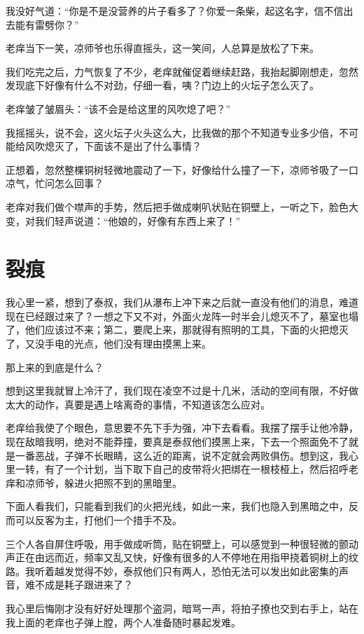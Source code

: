 我没好气道：“你是不是没营养的片子看多了？你爱一条柴，起这名字，信不信出去能有雷劈你？”

老痒当下一笑，凉师爷也乐得直摇头，这一笑间，人总算是放松了下来。

我们吃完之后，力气恢复了不少，老痒就催促着继续赶路，我抬起脚刚想走，忽然发现底下好像有什么不对劲，仔细一看，咦？门边上的火坛子怎么灭了。

老痒皱了皱眉头：“该不会是给这里的风吹熄了吧？”

我摇摇头，说不会，这火坛子火头这么大，比我做的那个不知道专业多少倍，不可能给风吹熄灭了，下面该不是出了什么事情？

正想着，忽然整棵铜树轻微地震动了一下，好像给什么撞了一下，凉师爷吸了一口凉气，忙问怎么回事？

老痒对我们做个噤声的手势，然后把手做成喇叭状贴在铜壁上，一听之下，脸色大变，对我们轻声说道：“他娘的，好像有东西上来了！”

\chapter{裂痕}

我心里一紧，想到了泰叔，我们从瀑布上冲下来之后就一直没有他们的消息，难道现在已经跟过来了？一想之下又不对，外面火龙阵一时半会儿熄灭不了，墓室也塌了，他们应该过不来；第二，要爬上来，那就得有照明的工具，下面的火把熄灭了，又没手电的光点，他们没有理由摸黑上来。

那上来的到底是什么？

想到这里我就冒上冷汗了，我们现在凌空不过是十几米，活动的空间有限，不好做太大的动作，真要是遇上啥离奇的事情，不知道该怎么应对。

老痒给我使了个眼色，意思要不先下手为强，冲下去看看。我摆了摆手让他冷静，现在敌暗我明，绝对不能莽撞，要真是泰叔他们摸黑上来，下去一个照面免不了就是一番恶战，子弹不长眼睛，这么近的距离，说不定就会两败俱伤。想到这，我心里一转，有了一个计划，当下取下自己的皮带将火把绑在一根枝桠上，然后招呼老痒和凉师爷，躲进火把照不到的黑暗里。

下面人看我们，只能看到我们的火把光线，如此一来，我们也隐入到黑暗之中，反而可以反客为主，打他们一个措手不及。

三个人各自屏住呼吸，用手做成听筒，贴在铜壁上，可以感觉到一种很轻微的颤动声正在由远而近，频率又乱又快，好像有很多的人不停地在用指甲挠着铜树上的纹路。我听着越发觉得不妙，泰叔他们只有两人，恐怕无法可以发出如此密集的声音，难不成是耗子跟进来了？

我心里后悔刚才没有好好处理那个盗洞，暗骂一声，将拍子撩也交到右手上，站在我上面的老痒也子弹上膛，两个人准备随时暴起发难。

